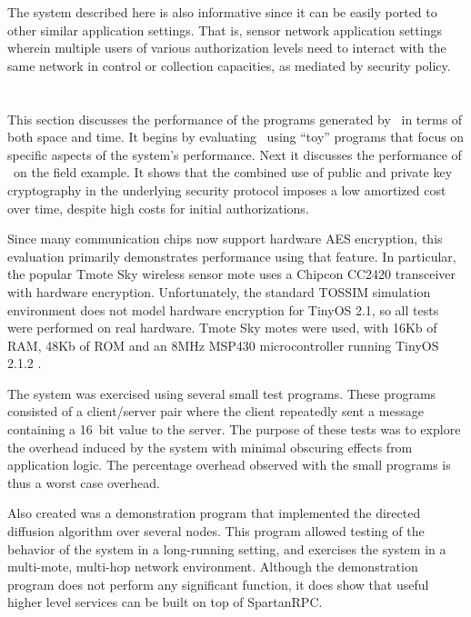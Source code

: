 The system described here is also informative since it can be easily ported to other similar
application settings. That is, sensor network application settings wherein multiple users of
various authorization levels need to interact with the same network in control or collection
capacities, as mediated by security policy.

\section{\Sprocket}
\label{section-sprocket-evaluation}

This section discusses the performance of the programs generated by \Sprocket\ in terms of
both space and time. It begins by evaluating \Sprocket\ using ``toy'' programs that focus on
specific aspects of the system's performance. Next it discusses the performance of \Sprocket\ on
the field example. It shows that the combined use of public and private key cryptography in the
underlying security protocol imposes a low amortized cost over time, despite high costs for
initial authorizations.

Since many communication chips now support hardware AES encryption, this evaluation primarily
demonstrates performance using that feature. In particular, the popular Tmote Sky wireless
sensor mote \cite{tmotesky-datasheet} uses a Chipcon CC2420 transceiver with hardware
encryption. Unfortunately, the standard TOSSIM simulation environment does not model hardware
encryption for TinyOS 2.1, so all tests were performed on real hardware. Tmote Sky motes were
used, with 16Kb of RAM, 48Kb of ROM and an 8MHz MSP430 microcontroller running TinyOS 2.1.2
\cite{tinyos}.

The system was exercised using several small test programs. These programs consisted of a
client/server pair where the client repeatedly sent a message containing a 16~bit value to the
server. The purpose of these tests was to explore the overhead induced by the system with
minimal obscuring effects from application logic. The percentage overhead observed with the
small programs is thus a worst case overhead.

Also created was a demonstration program that implemented the directed diffusion algorithm
\cite{intanagonwiwat-2003} over several nodes. This program allowed testing of the behavior of
the system in a long-running setting, and exercises the system in a multi-mote, multi-hop
network environment. Although the demonstration program does not perform any significant
function, it does show that useful higher level services can be built on top of SpartanRPC.

